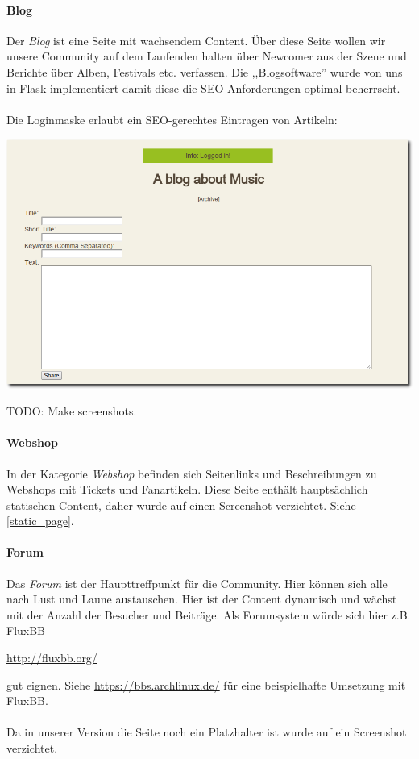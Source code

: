 \paragraph{Blog}
Der \emph{Blog} ist eine Seite mit wachsendem Content. Über diese Seite wollen
wir unsere Community auf dem Laufenden halten über Newcomer aus der Szene und
Berichte über Alben, Festivals etc. verfassen. Die ,,Blogsoftware'' wurde von
uns in Flask implementiert damit diese die SEO Anforderungen optimal beherrscht.
\\
\\
Die Loginmaske erlaubt ein SEO-gerechtes Eintragen von Artikeln:
\begin{center}
\includegraphics[scale=0.5]{../screenshots/post_entry.png}
\end{center}

TODO: Make screenshots.

\paragraph{Webshop}
In der Kategorie \emph{Webshop} befinden sich Seitenlinks und Beschreibungen zu
Webshops mit Tickets und Fanartikeln. Diese Seite enthält hauptsächlich
statischen Content, daher wurde auf einen Screenshot verzichtet. Siehe
\ref{static_page}.

\paragraph{Forum}
Das \emph{Forum} ist der Haupttreffpunkt für die Community. Hier können sich
alle nach Lust und Laune austauschen. Hier ist der Content dynamisch und wächst
mit der Anzahl der Besucher und Beiträge. Als Forumsystem würde sich hier
z.B. FluxBB 
\begin{center}
    \url{http://fluxbb.org/}
\end{center}
gut eignen. Siehe \url{https://bbs.archlinux.de/} für eine beispielhafte
Umsetzung mit FluxBB.
\\
\\
Da in unserer Version die Seite noch ein Platzhalter ist wurde auf ein Screenshot
verzichtet.


